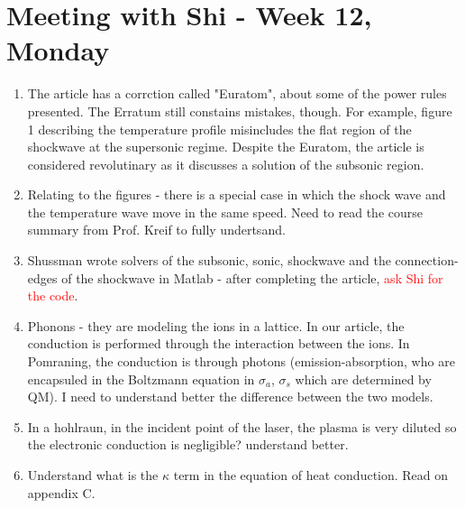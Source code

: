 \documentclass{article}
\begin{document}
\section{Meeting with Shi - Week 12, Monday}
\begin{enumerate}
    \item The article has a corrction called "Euratom", about some of the power rules presented.
    The Erratum still constains mistakes, though. For example, figure 1 describing the temperature profile misincludes
    the flat region of the shockwave at the supersonic regime.
    Despite the Euratom, the article is considered revolutinary as it discusses a solution of the subsonic region.
    \item Relating to the figures - there is a special case in which the shock wave and the temperature wave move 
    in the same speed. Need to read the course summary from Prof. Kreif to fully undertsand.
    \item Shussman wrote solvers of the subsonic, sonic, shockwave and the connection-edges of the shockwave in Matlab -
    after completing the article, \textcolor{red}{ask Shi for the code}.
    \item Phonons - they are modeling the ions in a lattice. In our article, the conduction is performed through
    the interaction between the ions. In Pomraning, the conduction is through photons (emission-absorption, who are 
    encapsuled in the Boltzmann equation in $\sigma_a$, $\sigma_s$ which are determined by QM).
    I need to understand better the difference between the two models.
    \item In a hohlraun, in the incident point of the laser, the plasma is very diluted so the electronic conduction is negligible? 
    understand better.
    \item Understand what is the $\kappa$ term in the equation of heat conduction. Read on appendix C.
    
\end{enumerate}
\end{document}
